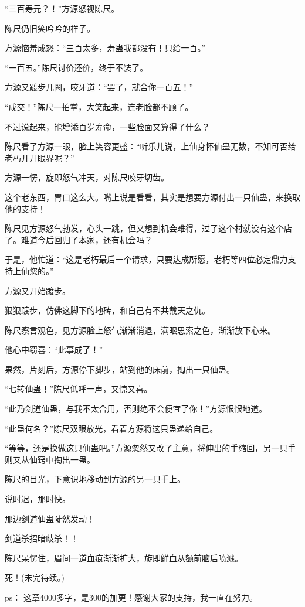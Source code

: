 \begin{this_body}
“三百寿元？！”方源怒视陈尺。

陈尺仍旧笑吟吟的样子。

方源恼羞成怒：“三百太多，寿蛊我都没有！只给一百。”

“一百五。”陈尺讨价还价，终于不装了。

方源又踱步几圈，咬牙道：“罢了，就舍你一百五！”

“成交！”陈尺一拍掌，大笑起来，连老脸都不顾了。

不过说起来，能增添百岁寿命，一些脸面又算得了什么？

陈尺看了方源一眼，脸上笑容更盛：“听乐儿说，上仙身怀仙蛊无数，不知可否给老朽开开眼界呢？”

方源一愣，旋即怒气冲天，对陈尺咬牙切齿。

这个老东西，胃口这么大。嘴上说是看看，其实是想要方源付出一只仙蛊，来换取他的支持！

陈尺见方源怒气勃发，心头一跳，但又想到机会难得，过了这个村就没有这个店了。难道今后回归了本家，还有机会吗？

于是，他忙道：“这是老朽最后一个请求，只要达成所愿，老朽等四位必定鼎力支持上仙您的。”

方源又开始踱步。

狠狠踱步，仿佛这脚下的地砖，和自己有不共戴天之仇。

陈尺察言观色，见方源脸上怒气渐渐消退，满眼思索之色，渐渐放下心来。

他心中窃喜：“此事成了！”

果然，片刻后，方源停下脚步，站到他的床前，掏出一只仙蛊。

“七转仙蛊！”陈尺低呼一声，又惊又喜。

“此乃剑道仙蛊，与我不太合用，否则绝不会便宜了你！”方源恨恨地道。

“此蛊何名？”陈尺双眼放光，看着方源将这只蛊递给自己。

“等等，还是换做这只仙蛊吧。”方源忽然又改了主意，将伸出的手缩回，另一只手则又从仙窍中掏出一蛊。

陈尺的目光，下意识地移动到方源的另一只手上。

说时迟，那时快。

那边剑道仙蛊陡然发动！

剑道杀招暗歧杀！！

陈尺呆愣住，眉间一道血痕渐渐扩大，旋即鲜血从额前脑后喷溅。

死！(未完待续。)

ps：    这章4000多字，是300的加更！感谢大家的支持，我一直在努力。

\end{this_body}

